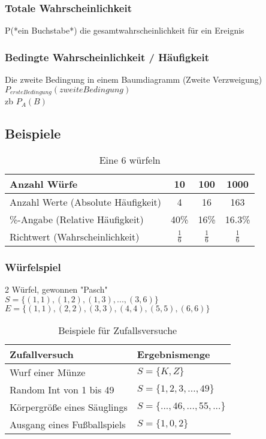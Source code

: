 \documentclass[a4paper,12pt]{article}
\begin{document}
\subsubsection{Totale Wahrscheinlichkeit}
P(*ein Buchstabe*) die gesamtwahrscheinlichkeit für ein Ereignis\\
\subsubsection{Bedingte Wahrscheinlichkeit / Häufigkeit}
Die zweite Bedingung in einem Baumdiagramm (Zweite Verzweigung)\\
$P_{ersteBedingung}(zweiteBedingung)$\\
zb $P_A(B)$
\subsection{Beispiele}
\begin{table}[h!]
  \begin{center}
    \caption{Eine 6 würfeln}
    \label{tab:table1}
    \begin{tabular}{l|c|c|c} %
      \textbf{Anzahl Würfe} & \textbf{10} & \textbf{100} & \textbf{1000}\\
      \hline
      Anzahl Werte (Absolute Häufigkeit) & 4 & 16 & 163\\
      \hline
      \%-Angabe (Relative Häufigkeit) & 40\% & 16\% & 16.3\%\\
      \hline
      Richtwert (Wahrscheinlichkeit) & $\frac{1}{6}$ & $\frac{1}{6}$ & $\frac{1}{6}$\\
    \end{tabular}
  \end{center}
\end{table}
\pagebreak
\subsubsection*{Würfelspiel}
2 Würfel, gewonnen "Pasch"\\
$S = \Big\{(1,1),(1,2),(1,3),...,(3,6)\Big\}$\\
$E = \Big\{(1,1),(2,2),(3,3),(4,4),(5,5),(6,6)\Big\}$\\
\begin{table}[h!]
  \begin{center}
    \caption{Beispiele für Zufallsversuche}
    \label{tab:table1}
    \begin{tabular}{l|l} %
      \textbf{Zufallversuch} & \textbf{Ergebnismenge}\\
      \hline
      Wurf einer Münze & $S = \{K,Z\}$\\
      \hline
      Random Int von 1 bis 49 & $S = \{1,2,3,...,49\}$\\
      \hline
      Körpergröße eines Säuglings & $S = \{...,46,...,55,...\}$\\
      \hline
      Ausgang eines Fußballspiels & $S = \{1,0,2\}$
    \end{tabular}
  \end{center}
\end{table}
\end{document}
